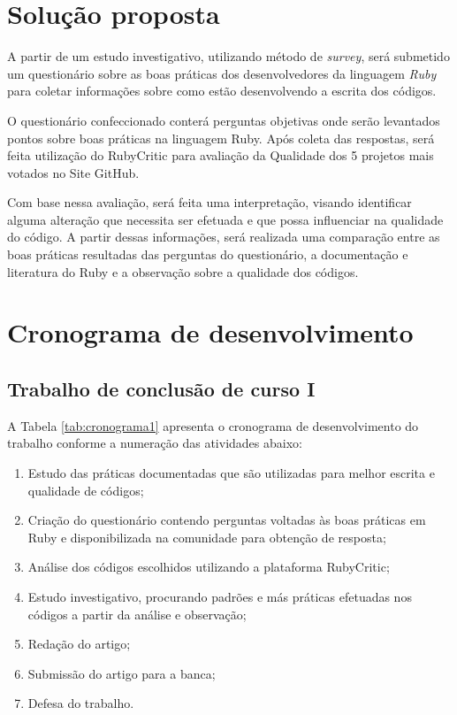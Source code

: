 \documentclass[11pt,a4paper]{article}
\begin{document}
\section{Solução proposta} 

A partir de um estudo investigativo, utilizando método de \textit{survey}, será submetido um questionário sobre as boas práticas dos desenvolvedores da linguagem \textit{Ruby} para coletar informações sobre como estão desenvolvendo a escrita dos códigos.

O questionário confeccionado conterá perguntas objetivas onde serão levantados pontos sobre boas práticas na linguagem Ruby. Após coleta das respostas, será feita utilização do RubyCritic para avaliação da Qualidade dos 5 projetos mais votados no Site GitHub. 

Com base nessa avaliação, será feita uma interpretação, visando identificar alguma alteração que necessita ser efetuada e que possa influenciar na qualidade do código. A partir dessas informações, será realizada uma comparação entre as boas práticas resultadas das perguntas do questionário, a documentação e literatura do Ruby e a observação sobre a qualidade dos códigos.


\section{Cronograma de desenvolvimento}\label{sec:cronograma}

\subsection{Trabalho de conclusão de curso I}

A Tabela \ref{tab:cronograma1} apresenta o cronograma de desenvolvimento do trabalho conforme a numeração das atividades abaixo:
\begin{enumerate}
    \item Estudo das práticas documentadas que são utilizadas para melhor escrita e qualidade de códigos;
	\item Criação do questionário contendo perguntas voltadas às boas práticas em Ruby e disponibilizada na comunidade para obtenção de resposta;
	\item Análise dos códigos escolhidos utilizando a plataforma RubyCritic;
	\item Estudo investigativo, procurando padrões e más práticas efetuadas nos códigos a partir da análise e observação;
	\item Redação do artigo;
	\item Submissão do artigo para a banca;
	\item Defesa do trabalho.
\end{enumerate}
\end{document}
